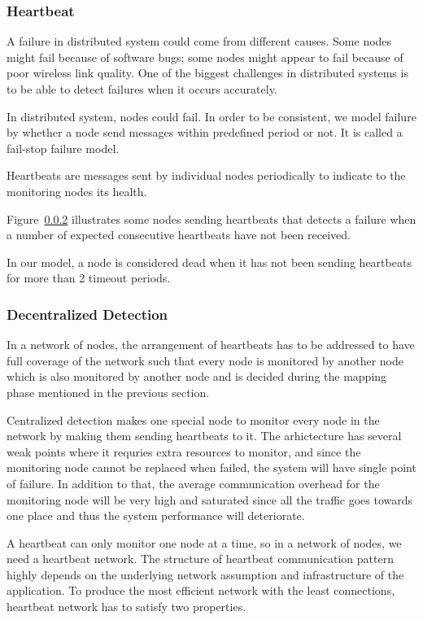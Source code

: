 \subsubsection{Heartbeat}

A failure in distributed system could come from different causes. Some nodes
might fail because of software bugs; some nodes might appear to fail because of
poor wireless link quality. One of the biggest challenges in distributed
systems is to be able to detect failures when it occurs accurately.

In distributed system, nodes could fail. In order to be consistent, we model
failure by whether a node send messages within predefined period or not. It is
called a fail-stop failure model.

Heartbeats are messages sent by individual nodes periodically to indicate to
the monitoring nodes its health.

Figure~\ref{} illustrates some nodes sending heartbeats that detects
a failure when a number of expected consecutive heartbeats have not been
received.

In our model, a node is considered dead when it has not been sending heartbeats
for more than 2 timeout periods.


\subsubsection{Decentralized Detection}

In a network of nodes, the arrangement of heartbeats has to be addressed to
have full coverage of the network such that every node is monitored by another
node which is also monitored by another node and is decided during the mapping
phase mentioned in the previous section.

Centralized detection makes one special node to monitor every node in the
network by making them sending heartbeats to it. The arhictecture has several
weak points where it requries extra resources to monitor, and since the
monitoring node cannot be replaced when failed, the system will have single
point of failure. In addition to that, the average communication overhead for
the monitoring node will be very high and saturated since all the traffic goes
towards one place and thus the system performance will deteriorate.


A heartbeat can only monitor one node at a time, so in a network of nodes, we
need a heartbeat network. The structure of heartbeat communication pattern
highly depends on the underlying network assumption and infrastructure of the
application. To produce the most efficient network with the least connections,
  heartbeat network has to satisfy two properties.

